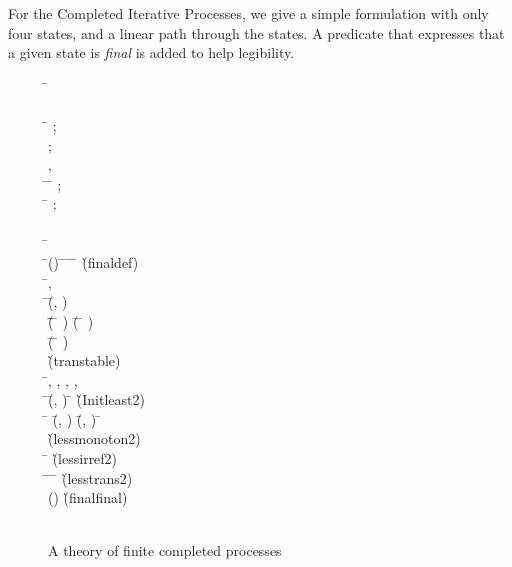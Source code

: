 For the Completed Iterative Processes, we give a simple 
formulation with only four states, and a linear path through
the states.  A predicate that expresses that a given state is
\emph{final} is added to help legibility.
\begin{figure}[!ht]
\begin{hetcasl}
\SPEC \= \Ax{=}\\
\> \SORT {}\\
\> \OPS \= \Ax{:} ;\\
\>\>  \Ax{:} ;\\
\>\> ,  \Ax{:} \\
\> \PREDS \= \Ax{:} \= \Ax{\times} ;\\
\>\> \Ax{\_\_}\Ax{<}\Ax{\_\_} \Ax{:} \= \Ax{\times} ;\\
\>\>  \Ax{:} \\
\> \Ax{\forall} \= \Ax{:}  \\
\> \Ax{\bullet} \=() \Ax{\Leftrightarrow} \=\Ax{\forall}  \Ax{:}  \Ax{\bullet} \=\Ax{\neg} \= \Ax{=}  \Ax{\Rightarrow} \= \Ax{<}  \`{\small{}\KW{\%}(final\Ax{\_}def)\KW{\%}}\\
\> \Ax{\forall} \=,  \Ax{:}  \\
\> \Ax{\bullet} \=(\=, ) \\
\>\> \Ax{\Leftrightarrow} \=(\= \Ax{=}  \Ax{\wedge} \= \Ax{=} ) \Ax{\vee} (\= \Ax{=}  \Ax{\wedge} \= \Ax{=} ) \\
\>\>\> \Ax{\vee} (\= \Ax{=}  \Ax{\wedge} \= \Ax{=} ) \\
\> \`{\small{}\KW{\%}(trans\Ax{\_}table)\KW{\%}}\\
\> \Ax{\forall} \=, , , ,  \Ax{:}  \\
\> \Ax{\bullet} \=(\=, ) \Ax{\Rightarrow} \= \Ax{<}  \`{\small{}\KW{\%}(Init\Ax{\_}least2)\KW{\%}}\\
\> \Ax{\bullet} \= \Ax{<}  \Ax{\wedge} (\=, ) \Ax{\wedge} (\=, ) \Ax{\Rightarrow} \= \Ax{<}  \\
\> \`{\small{}\KW{\%}(less\Ax{\_}monoton2)\KW{\%}}\\
\> \Ax{\bullet} \Ax{\neg} \= \Ax{<}  \`{\small{}\KW{\%}(less\Ax{\_}irref2)\KW{\%}}\\
\> \Ax{\bullet} \= \Ax{<}  \Ax{\wedge} \= \Ax{<}  \Ax{\Rightarrow} \= \Ax{<}  \`{\small{}\KW{\%}(less\Ax{\_}trans2)\KW{\%}}\\
\> \Ax{\bullet} () \`{\small{}\KW{\%}(final\Ax{\_}final)\KW{\%}}\\
\\
\end{hetcasl}
\caption{A theory of finite completed processes}
\label{fig:fin_comp}
\end{figure}

